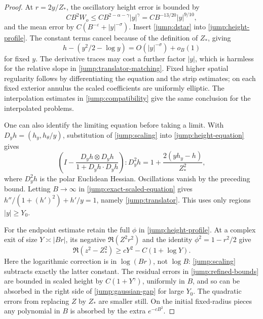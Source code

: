 \begin{proof}
At $r=2y/Z_*$, the oscillatory height error is bounded by
\[
 CB^2W_o\leq CB^{2-\alpha-\gamma}|y|^\gamma
             =CB^{-13/20}|y|^{9/10},
\]
and the mean error by $C(B^{-\varepsilon}+|y|^{-\sigma})$.
Insert \eqref{jump:dstar} into
\eqref{jump:height-profile}.  The constant terms cancel because
of the definition of $Z_*$, giving
\begin{equation}\label{jump:h-match}
 h-(y^2/2-\log y)
   =O(|y|^{-\sigma})+o_B(1)
\end{equation}
for fixed $y$.  The derivative traces may cost a further factor
$|y|$, which is harmless for the relative slope in
\eqref{jump:translator-matching}.  Fixed higher spatial regularity follows
by differentiating the equation and the strip estimates; on each
fixed exterior annulus the scaled coefficients are uniformly
elliptic.  The interpolation estimates in
\cref{jump:compatibility} give the same conclusion for the
interpolated problems.

One can also identify the limiting equation before taking a limit.
With $D_yh=(h_y,h_\theta/y)$, substitution of
\eqref{jump:scaling} into \eqref{jump:height-equation} gives
\begin{equation}\label{jump:exact-scaled-equation}
 \left(I-\frac{D_yh\otimes D_yh}{1+D_yh\cdot D_yh}\right)
       :D_y^2h
       =1+\frac{2(yh_y-h)}{Z_*^2},
\end{equation}
where $D_y^2h$ is the polar Euclidean Hessian.  Oscillations vanish
by the preceding bound.  Letting $B\to\infty$ in
\eqref{jump:exact-scaled-equation} gives
$h''/(1+(h')^2)+h'/y=1$, namely \eqref{jump:translator}.
This uses only regions $|y|\geq Y_0$.

For the endpoint estimate retain the full $\phi$ in
\eqref{jump:height-profile}.  At a complex exit of size
$Y\asymp|Br|$, its negative $\Re(Z^2r^2)$ and the identity
$\phi^2=1-r^2/2$ give
\begin{equation}\label{jump:gaussian-gap}
 \Re(z^2-Z_*^2)\geq cY^2-C(1+\log Y).
\end{equation}
Here the logarithmic correction is in $\log(Br)$, not $\log B$:
\eqref{jump:scaling} subtracts exactly the latter constant.
The residual errors in \eqref{jump:refined-bounds} are bounded in
scaled height by $C(1+Y^\gamma)$, uniformly in $B$, and so can be
absorbed in the right side of \eqref{jump:gaussian-gap} for large
$Y_0$.  The quadratic errors from replacing $Z$ by $Z_*$ are
smaller still.  On the initial fixed-radius pieces any polynomial
in $B$ is absorbed by the extra $e^{-cB^2}$.


\end{proof}

